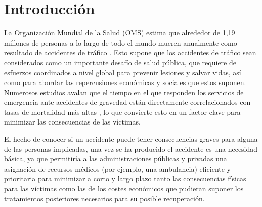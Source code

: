 \chapter{Introducción} \label{CAP_01}









La Organización Mundial de la Salud (OMS) estima que alrededor de 1,19 millones de personas a lo largo de todo el mundo mueren anualmente como resultado de accidentes de tráfico \cite{WHO}. Esto supone que los accidentes de tráfico sean considerados como un importante desafío de salud pública, que requiere de esfuerzos coordinados a nivel global para prevenir lesiones y salvar vidas, así como para abordar las repercusiones económicas y sociales que estos suponen. Numerosos estudios avalan que el tiempo en el que responden los servicios de emergencia ante accidentes de gravedad están directamente correlacionados con tasas de mortalidad más altas \cite{timeresponse_deaths}, lo que convierte esto en un factor clave para minimizar las consecuencias de las víctimas.



El hecho de conocer si un accidente puede tener consecuencias graves para alguna de las personas implicadas, una vez se ha producido el accidente es una necesidad básica, ya que permitiría a las administraciones públicas y privadas una asignación de recursos médicos (por ejemplo, una ambulancia) eficiente y prioritaria para minimizar a corto y largo plazo tanto las consecuencias físicas para las víctimas como las de los costes económicos que pudieran suponer los tratamientos posteriores necesarios para su posible recuperación.  

